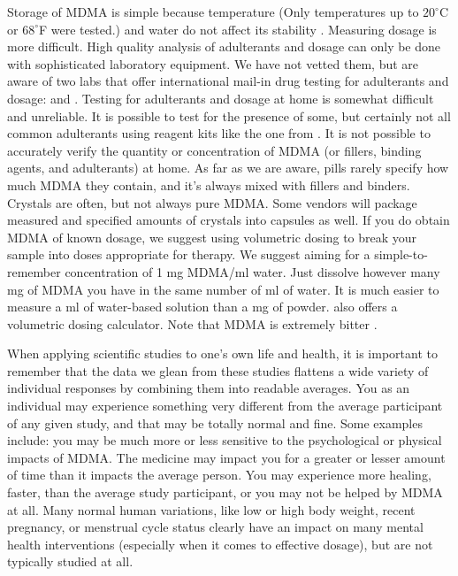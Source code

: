 \documentclass[12pt,letterpaper]{book}
\begin{document}
\label{testing}
Storage of MDMA is simple because temperature (Only temperatures up to $20^{\circ}$C or $68^{\circ}$F were tested.) and water do not affect its stability \cite{clauwaertStability}. Measuring dosage is more difficult. High quality analysis of adulterants and dosage can only be done with sophisticated laboratory equipment. We have not vetted them, but are aware of two labs that offer international mail-in drug testing for adulterants and dosage: \textcite{kykeonTesting} and \textcite{energyTesting}. Testing for adulterants and dosage at home is somewhat difficult and unreliable. It is possible to test for the presence of some, but certainly not all common adulterants using reagent kits like the one from \textcite{danceSafeTestingKit} \cite{reagentInstructions}. It is not possible to accurately verify the quantity or concentration of MDMA (or fillers, binding agents, and adulterants) at home. As far as we are aware, pills rarely specify how much MDMA they contain, and it's always mixed with fillers and binders. Crystals are often, but not always pure MDMA. Some vendors will package measured and specified amounts of crystals into capsules as well. If you do obtain MDMA of known dosage, we suggest using volumetric dosing to break your sample into doses appropriate for therapy. We suggest aiming for a simple-to-remember concentration of 1 mg MDMA/ml water. Just dissolve however many mg of MDMA you have in the same number of ml of water. It is much easier to measure a ml of water-based solution than a mg of powder. \textcite{volumetricDilution} also offers a volumetric dosing calculator. Note that MDMA is extremely bitter \cite{milivcevic2020bitter}.

When applying scientific studies to one's own life and health, it is important to remember that the data we glean from these studies flattens a wide variety of individual responses by combining them into readable averages. You as an individual may experience something very different from the average participant of any given study, and that may be totally normal and fine. Some examples include: you may be much more or less sensitive to the psychological or physical impacts of MDMA. The medicine may impact you for a greater or lesser amount of time than it impacts the average person. You may experience more healing, faster, than the average study participant, or you may not be helped by MDMA at all. Many normal human variations, like low or high body weight, recent pregnancy, or menstrual cycle status clearly have an impact on many mental health interventions (especially when it comes to effective dosage), but are not typically studied at all.
\end{document}
